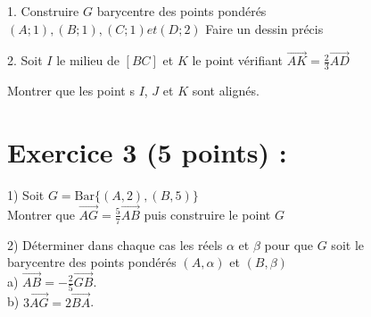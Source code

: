 \documentclass{article}
\begin{document}
1. Construire $G$ barycentre des points pondérés
$(A;1), (B;1), (C;1) et (D;2)$
Faire un dessin précis 

2. Soit $I$ le milieu de $[BC]$ et $K$ le point vérifiant $\overrightarrow{AK}=\frac{2}{3}\overrightarrow{AD}$

Montrer que les point s $I$, $J$ et $K$ sont alignés.
\section*{Exercice 3 (5 points) :}
1) Soit $G=\mathrm{Bar}\lbrace (A,2),(B,5)\rbrace$\\
Montrer que $\overrightarrow{AG}=\frac{5}{7}\overrightarrow{AB}$ puis construire le point $G$

2) Déterminer dans chaque cas les réels $\alpha$ et $\beta$ pour que $G$ soit le \\barycentre des points pondérés $(A,\alpha)$ et $(B,\beta)$\\
a) $\overrightarrow{AB}=-\frac{2}{5}\overrightarrow{GB}$.\\
b) $3\overrightarrow{AG}=2\overrightarrow{BA}$.\\
\end{document}
